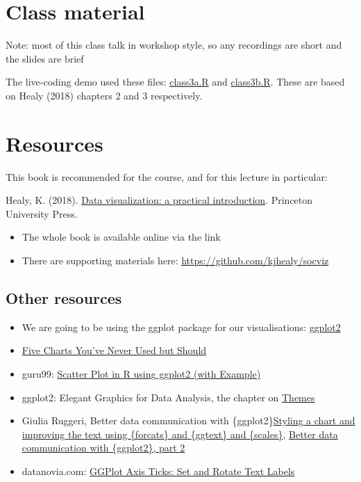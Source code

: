 \documentclass[
]{book}
\providecommand{\tightlist}{%
  \setlength{\itemsep}{0pt}\setlength{\parskip}{0pt}}
\begin{document}
\hypertarget{class-material-1}{%
\section{Class material}\label{class-material-1}}

Note: most of this class talk in workshop style, so any recordings are short and the slides are brief

The live-coding demo used these files: \href{static/class3a.R}{class3a.R} and \href{static/class3b.R}{class3b.R}. These are based on Healy (2018) chapters 2 and 3 respectively.

\hypertarget{resources-2}{%
\section{Resources}\label{resources-2}}

This book is recommended for the course, and for this lecture in particular:

Healy, K. (2018). \href{https://socviz.co/}{Data visualization: a practical introduction}. Princeton University Press.

\begin{itemize}
\tightlist
\item
  The whole book is available online via the link\\
\item
  There are supporting materials here: \url{https://github.com/kjhealy/socviz}
\end{itemize}

\hypertarget{other-resources}{%
\subsection{Other resources}\label{other-resources}}

\begin{itemize}
\tightlist
\item
  We are going to be using the ggplot package for our visualisations: \href{https://ggplot2.tidyverse.org/}{ggplot2}
\item
  \href{https://policyviz.com/2021/02/08/five-charts-youve-never-used-but-should/}{Five Charts You've Never Used but Should}
\item
  guru99: \href{https://www.guru99.com/r-scatter-plot-ggplot2.html}{Scatter Plot in R using ggplot2 (with Example)}
\item
  ggplot2: Elegant Graphics for Data Analysis, the chapter on \href{https://ggplot2-book.org/polishing.html}{Themes}
\item
  Giulia Ruggeri, Better data communication with \{ggplot2\}\href{https://giulia-ruggeri.medium.com/better-data-communication-with-ggplot2-92fbcfea2c6e}{Styling a chart and improving the text using \{forcats\} and \{ggtext\} and \{scales\}}, \href{https://giulia-ruggeri.medium.com/better-data-communication-with-ggplot2-part-2-615a5180ccb}{Better data communication with \{ggplot2\}, part 2}
\item
  datanovia.com: \href{https://www.datanovia.com/en/blog/ggplot-axis-ticks-set-and-rotate-text-labels/}{GGPlot Axis Ticks: Set and Rotate Text Labels}
\end{itemize}
\end{document}
